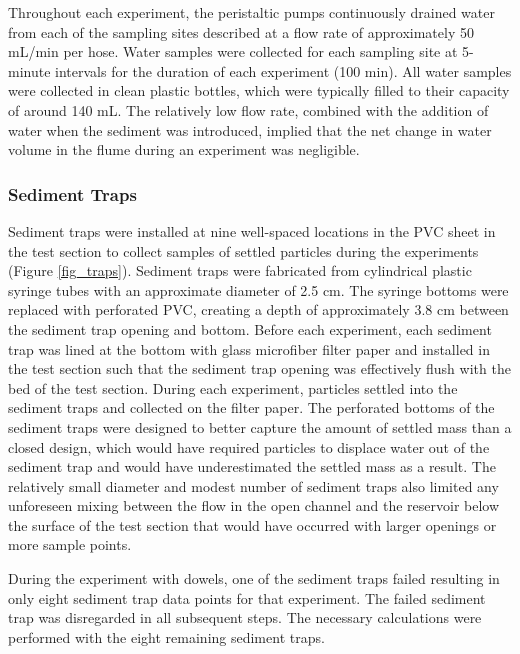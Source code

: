 \documentclass[12pt]{article}
\begin{document}
Throughout each experiment, the peristaltic pumps continuously drained water from each of the sampling sites described at a flow rate of approximately 50 mL/min per hose. Water samples were collected for each sampling site at 5-minute intervals for the duration of each experiment (100 min). All water samples were collected in clean plastic bottles, which were typically filled to their capacity of around 140 mL. The relatively low flow rate, combined with the addition of water when the sediment was introduced, implied that the net change in water volume in the flume during an experiment was negligible.

\subsubsection{Sediment Traps}

Sediment traps were installed at nine well-spaced locations in the PVC sheet in the test section to collect samples of settled particles during the experiments (Figure \ref{fig_traps}). Sediment traps were fabricated from cylindrical plastic syringe tubes with an approximate diameter of 2.5 cm. The syringe bottoms were replaced with perforated PVC, creating a depth of approximately 3.8 cm between the sediment trap opening and bottom. Before each experiment, each sediment trap was lined at the bottom with glass microfiber filter paper and installed in the test section such that the sediment trap opening was effectively flush with the bed of the test section. During each experiment, particles settled into the sediment traps and collected on the filter paper. The perforated bottoms of the sediment traps were designed to better capture the amount of settled mass than a closed design, which would have required particles to displace water out of the sediment trap and would have underestimated the settled mass as a result. The relatively small diameter and modest number of sediment traps also limited any unforeseen mixing between the flow in the open channel and the reservoir below the surface of the test section that would have occurred with larger openings or more sample points.

During the experiment with dowels, one of the sediment traps failed resulting in only eight sediment trap data points for that experiment. The failed sediment trap was disregarded in all subsequent steps. The necessary calculations were performed with the eight remaining sediment traps.
\end{document}
